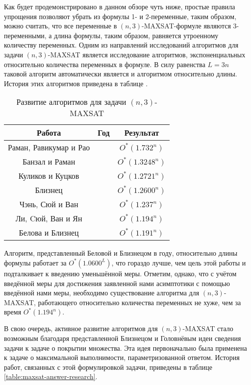 Как будет продемонстрировано в данном обзоре чуть ниже, простые правила упрощения позволяют убрать из формулы 1- и 2-переменные, таким образом, можно считать, что все переменные в $(n,3)$-MAXSAT-формуле являются 3-переменными, а длина формулы, таким образом, равняется утроенному количеству переменных. Одним из направлений исследований алгоритмов для задачи $(n,3)$-MAXSAT является исследование алгоритмов, экспоненциальных относительно количества переменных в формуле. В силу равенства $L = 3n$ таковой алгоритм автоматически является и алгоритмом относительно длины. История этих алгоритмов приведена в таблице \label{table:n3-maxsat-research}.

\begin{table}[ht]
 \caption{Развитие алгоритмов для задачи $(n,3)$-MAXSAT}
 \centering
 \begin{tabular}{|c|c|c|}
  \hline
  \textbf{Работа} & \textbf{Год} & \textbf{Результат} \\
  \hline
  Раман, Равикумар и Рао \cite{raman1998simplified} & \citeyear{raman1998simplified} & $O^*(1.732^n)$ \\
  Банзал и Раман \cite{bansal99} & \citeyear{bansal99} & $O^*(1.3248^n)$ \\
  Куликов и Куцков \cite{kulikov2009new} & \citeyear{kulikov2009new} & $O^*(1.2721^n)$ \\
  Близнец \cite{bliznets2013new} & \citeyear{bliznets2013new} & $O^*(1.2600^n)$ \\
  Чэнь, Сюй и Ван \cite{chen15} & \citeyear{chen15} & $O^*(1.237^n)$ \\
  Ли, Cюй, Ван и Ян \cite{li2017improved} & \citeyear{li2017improved} & $O^*(1.194^n)$ \\
  Белова и Близнец \cite{belova18} & \citeyear{belova18} & $O^*(1.191^n)$ \\
  \hline
 \end{tabular}
 \label{table:n3-maxsat-research}
\end{table}

Алгоритм, представленный Беловой и Близнецом в \citeyear{belova18} году, относительно длины формулы работает за $O^*(1.0600^L)$, что гораздо лучше, чем цель этой работы и подталкивает к введению уменьшённой меры. Отметим, однако, что с учётом введённой меры для достижения заявленной нами асимптотики с помощью введённой нами меры, необходимо существование алгоритма для $(n,3)$-MAXSAT, работающего относительно количества переменных не хуже, чем за время $O^*(1.194^n)$.

В свою очередь, активное развитие алгоритмов для $(n,3)$-MAXSAT стало возможным благодаря представленной Близнецом и Головнёвым \cite{bliznets12} идеи сведения задачи к задаче о покрытии множества. Эта идея первоначально была применена к задаче о максимальной выполнимости, параметризованной ответом. История работ, связанных с этой формулировкой задачи, приведены в таблице \ref{table:maxsat-answer-research}.

